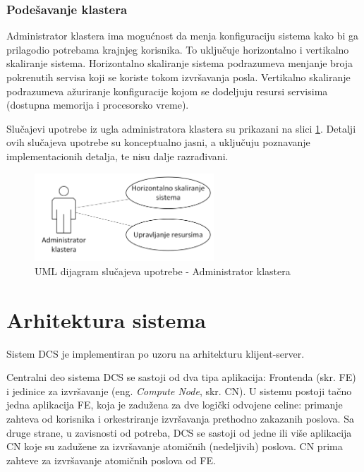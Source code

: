 \documentclass[12pt,oneside]{memoir}
\begin{document}
\subsubsection{Podešavanje klastera}
Administrator klastera ima mogućnost da menja konfiguraciju sistema kako bi ga prilagodio potrebama krajnjeg korisnika. To uključuje horizontalno i vertikalno skaliranje sistema. Horizontalno skaliranje sistema podrazumeva menjanje broja pokrenutih servisa koji se koriste tokom izvršavanja posla. Vertikalno skaliranje podrazumeva ažuriranje konfiguracije kojom se dodeljuju resursi servisima (dostupna memorija i procesorsko vreme).

Slučajevi upotrebe iz ugla administratora klastera su prikazani na slici \ref{fig:slucajupotrebe_admin_klastera}. Detalji ovih slučajeva upotrebe su konceptualno jasni, a uključuju poznavanje implementacionih detalja, te nisu dalje razrađivani.

\begin{figure}[!ht]
  \centering
  \includegraphics[width=0.6\textwidth]{./images/dijagram_slucajeva_upotrebe_administrator_klastera.png}
  \caption{UML dijagram slučajeva upotrebe - Administrator klastera}
  \label{fig:slucajupotrebe_admin_klastera}
\end{figure}

\section{Arhitektura sistema}

Sistem DCS je implementiran po uzoru na arhitekturu klijent-server.

Centralni deo sistema DCS se sastoji od dva tipa aplikacija: Frontenda (skr. FE) i jedinice za izvršavanje (eng. \emph{Compute Node}, skr. CN). 
U sistemu postoji tačno jedna aplikacija FE, koja je zadužena za dve logički odvojene celine: primanje zahteva od korisnika i orkestriranje izvršavanja prethodno zakazanih poslova.
Sa druge strane, u zavisnosti od potreba, DCS se sastoji od jedne ili više aplikacija CN koje su zadužene za izvršavanje atomičnih (nedeljivih) poslova. CN prima zahteve za izvršavanje atomičnih poslova od FE.
\end{document}
